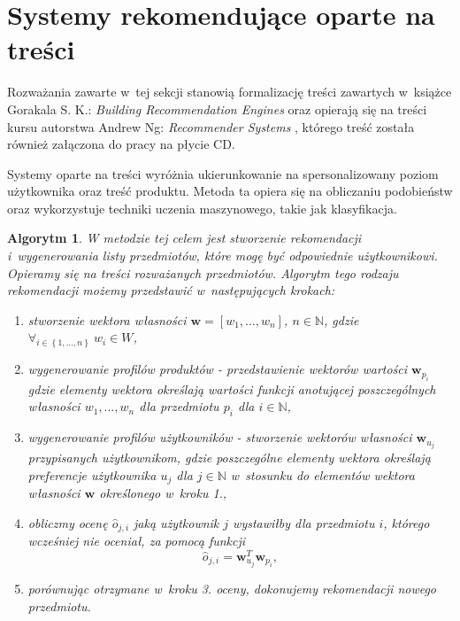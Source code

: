 \documentclass[12pt,a4paper]{report}
\newtheorem{algorytm}[df]{Algorytm}
\newcommand{\set}[1]{\left\lbrace {#1} \right\rbrace}
\newcommand{\setN}{\mathbb{N}}
\newcommand{\setWlasnosci}{\mathit{W}}
\begin{document}
\section{Systemy rekomendujące oparte na treści}
Rozważania zawarte w~tej sekcji stanowią formalizację treści zawartych w~książce Gorakala S. K.: \textit{Building Recommendation Engines} {\citep[Sec 3]{bre}} oraz opierają się na treści kursu autorstwa Andrew Ng: \textit{Recommender Systems} {\citep{rs}}, którego treść została również załączona do pracy na płycie CD.
\bigskip

Systemy oparte na treści wyróżnia ukierunkowanie na spersonalizowany poziom użytkownika oraz treść produktu. Metoda ta opiera się na obliczaniu podobieństw oraz wykorzystuje techniki uczenia maszynowego, takie jak klasyfikacja.

\begin{algorytm}
W metodzie tej celem jest stworzenie rekomendacji i~wygenerowania listy przedmiotów, które mogę być odpowiednie użytkownikowi. Opieramy się na treści rozważanych przedmiotów. Algorytm tego rodzaju rekomendacji możemy przedstawić w~następujących krokach:
\begin{enumerate}
\item stworzenie wektora własności $\mathbf{w} = [w_1, \ldots, w_n]$, $n \in \setN$, gdzie $\forall_{i \in \set{1, \ldots, n}} \: w_i \in \setWlasnosci$,

\item wygenerowanie profilów produktów - przedstawienie wektorów wartości $\mathbf{w}_{p_i}$ gdzie elementy wektora określają wartości funkcji anotującej poszczególnych własności $w_1, \ldots, w_n$ dla przedmiotu $p_i$ dla $i \in \setN$,

\item wygenerowanie profilów użytkowników - stworzenie wektorów własności $\mathbf{w}_{u_j}$ przypisanych użytkownikom, gdzie poszczególne elementy wektora określają preferencje użytkownika $u_j$ dla $j \in \setN$ w~stosunku do elementów wektora własności $\mathbf{w}$ określonego w~kroku 1.,

\item obliczmy ocenę $\widehat{o}_{j,i}$ jaką użytkownik $j$ wystawiłby dla przedmiotu $i$, którego wcześniej nie oceniał, za pomocą funkcji
$$
\widehat{o}_{j,i} = \mathbf{w}_{u_j}^T \mathbf{w}_{p_i},
$$

\item porównując otrzymane w~kroku 3. oceny, dokonujemy rekomendacji nowego przedmiotu.
\end{enumerate}
\end{algorytm}
\end{document}
